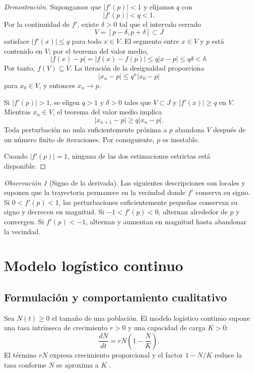 \documentclass[11pt,letterpaper]{article}
\theoremstyle{definition}
\theoremstyle{remark}
\newtheorem{observacion}[teorema]{Observación}
\newenvironment{demostracion}{\begin{proof}[Demostración]}{\end{proof}}
\begin{document}
\begin{demostracion}
Supongamos que \(\lvert f'(p)\rvert<1\) y elijamos \(q\) con
\[
\lvert f'(p)\rvert<q<1.
\]
Por la continuidad de \(f'\), existe \(\delta>0\) tal que el intervalo cerrado
\[
V=[p-\delta,p+\delta]\subset J
\]
satisface \(\lvert f'(x)\rvert\leq q\) para todo \(x\in V\). El segmento entre \(x\in V\) y \(p\) está contenido en \(V\); por el teorema del valor medio,
\[
\lvert f(x)-p\rvert
=\lvert f(x)-f(p)\rvert
\leq q\lvert x-p\rvert
\leq q\delta<\delta.
\]
Por tanto, \(f(V)\subseteq V\). La iteración de la desigualdad proporciona
\[
\lvert x_n-p\rvert\leq q^n\lvert x_0-p\rvert
\]
para \(x_0\in V\), y entonces \(x_n\to p\).

Si \(\lvert f'(p)\rvert>1\), se eligen \(q>1\) y \(\delta>0\) tales que \(V\subset J\) y \(\lvert f'(x)\rvert\geq q\) en \(V\). Mientras \(x_n\in V\), el teorema del valor medio implica
\[
\lvert x_{n+1}-p\rvert\geq q\lvert x_n-p\rvert.
\]
Toda perturbación no nula suficientemente próxima a \(p\) abandona \(V\) después de un número finito de iteraciones. Por consiguiente, \(p\) es inestable.

Cuando \(\lvert f'(p)\rvert=1\), ninguna de las dos estimaciones estrictas está disponible.
\end{demostracion}

\begin{observacion}[Signo de la derivada]
Las siguientes descripciones son locales y suponen que la trayectoria permanece en la vecindad donde \(f'\) conserva su signo. Si \(0<f'(p)<1\), las perturbaciones suficientemente pequeñas conservan su signo y decrecen en magnitud. Si \(-1<f'(p)<0\), alternan alrededor de \(p\) y convergen. Si \(f'(p)<-1\), alternan y aumentan en magnitud hasta abandonar la vecindad.
\end{observacion}

\section{Modelo logístico continuo}
\label{sec:logistico-continuo}

\subsection{Formulación y comportamiento cualitativo}

Sea \(N(t)\geq0\) el tamaño de una población. El modelo logístico continuo supone una tasa intrínseca de crecimiento \(r>0\) y una capacidad de carga \(K>0\):
\[
\frac{dN}{dt}=rN\left(1-\frac{N}{K}\right).
\]
El término \(rN\) expresa crecimiento proporcional y el factor \(1-N/K\) reduce la tasa conforme \(N\) se aproxima a \(K\) \cite{ApuntesMM1_2026,NagleSaffSnider2018}.
\end{document}
